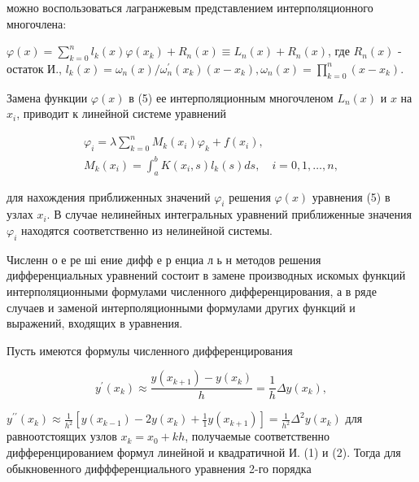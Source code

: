 \documentclass[10pt]{article}
\begin{document}
можно воспользоваться лагранжевым представлением интерполяционного многочлена:



$\varphi(x)=\sum_{k=0}^{n} l_{k}(x) \varphi\left(x_{k}\right)+R_{n}(x) \equiv L_{n}(x)+R_{n}(x)$, где $R_{n}(x)$ - остаток И., $l_{k}(x)=\omega_{n}(x) / \omega_{n}^{\prime}\left(x_{k}\right)\left(x-x_{k}\right), \omega_{n}(x)=\prod_{k=0}^{n}\left(x-x_{k}\right)$.



Замена функции $\varphi(x)$ в (5) ее интерполяционным многочленом $L_{n}(x)$ и $x$ на $x_{i}$, приводит к линейной системе уравнений



\[

\begin{gathered}

\varphi_{i}=\lambda \sum_{k=0}^{n} M_{k}\left(x_{i}\right) \varphi_{k}+f\left(x_{i}\right), \\

M_{k}\left(x_{i}\right)=\int_{a}^{b} K\left(x_{i}, s\right) l_{k}(s) d s, \quad i=0,1, \ldots, n,

\end{gathered}

\]



для нахождения приближенных значений $\varphi_{i}$ решения $\varphi(x)$ уравнения (5) в узлах $x_{i}$. В случае нелинейных интегральных уравнений приближенные значения $\varphi_{i}$ находятся соответственно из нелинейной системы.



Численн о е ре ші ение дифф е р енциа л ь н методов решения дифференциальных уравнений состоит в замене производных искомых функций интерполяционными формулами численного дифференцирования, а в ряде случаев и заменой интерполяционными формулами других функций и выражений, входящих в уравнения.



Пусть имеются формулы численного дифференцирования



\[

y^{\prime}\left(x_{k}\right) \approx \frac{y\left(x_{k+1}\right)-y\left(x_{k}\right)}{h}=\frac{1}{h} \Delta y\left(x_{k}\right),

\]



$y^{\prime \prime}\left(x_{k}\right) \approx \frac{1}{h^{2}}\left[y\left(x_{k-1}\right)-2 y\left(x_{k}\right)+\frac{1}{1} y\left(x_{k+1}\right)\right]=\frac{1}{h^{2}} \Delta^{2} y\left(x_{k}\right)$ для равноотстоящих узлов $x_{k}=x_{0}+k h$, получаемые соответственно дифференцированием формул линейной и квадратичной И. (1) и (2). Тогда для обыкновенного диффференциального уравнения 2-го порядка
\end{document}
